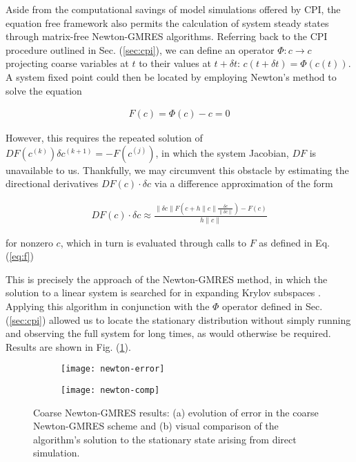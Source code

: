 \documentclass[epjST, final]{svjour}
\begin{document}
\begin{onehalfspace}
Aside from the computational savings of model simulations offered by CPI, the equation free framework also permits the calculation of system steady states through matrix-free Newton-GMRES algorithms. Referring back to the CPI procedure outlined in Sec. (\ref{sec:cpi}), we can define an operator $\Phi: c \rightarrow c$ projecting coarse variables at $t$ to their values at $t + \delta t$: $c(t+\delta t) =\Phi(c(t))$. A system fixed point could then be located by employing Newton's method to solve the equation

\begin{align}
\label{eq:f}
F(c) = \Phi(c) - c = 0
\end{align}

However, this requires the repeated solution of $DF(c^{(k)}) \delta c^{(k+1)} = -F(c^{(j)})$, in which the system Jacobian, $DF$ is unavailable to us. Thankfully, we may circumvent this obstacle by estimating the directional derivatives $DF(c) \cdot \delta c$ via a difference approximation of the form

\begin{align}
  DF(c) \cdot \delta c \approx \frac{\| \delta c \| F(c + h \| c \| \frac{\delta c}{\| \delta c \|}) - F(c)}{h \| c \|}
\end{align}

for nonzero $c$, which in turn is evaluated through calls to $F$ as defined in Eq. (\ref{eq:f})

This is precisely the approach of the Newton-GMRES method, in which the solution to a linear system is searched for in expanding Krylov subspaces \cite{kelley_solving_2003}. Applying this algorithm in conjunction with the $\Phi$ operator defined in Sec. (\ref{sec:cpi}) allowed us to locate the stationary distribution without simply running and observing the full system for long times, as would otherwise be required. Results are shown in Fig. (\ref{fig:newton-results}).

\begin{figure}[h!]
  \vspace{-5mm}
  \centering
  \begin{subfigure}{0.49\textwidth}
    \centering
    \texttt{[image: newton-error]}
    \subcaption{\label{fig:newton-error}}
  \end{subfigure} %
  \begin{subfigure}{0.49\textwidth}
    \centering
    \texttt{[image: newton-comp]}
    \subcaption{\label{fig:newton-comp}}
  \end{subfigure}%
  \caption{Coarse Newton-GMRES results: (a) evolution of error in the
    coarse Newton-GMRES scheme and (b) visual comparison of the
    algorithm's solution to the stationary state arising from direct
    simulation. \label{fig:newton-results}}
\end{figure}



\end{onehalfspace}
\end{document}
